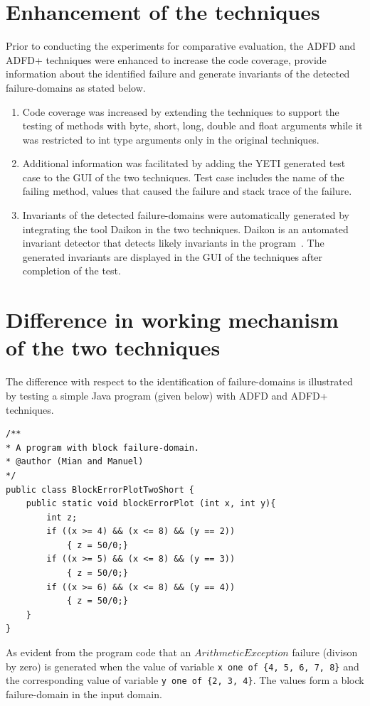 \section{Enhancement of the techniques}
Prior to conducting the experiments for comparative evaluation, the ADFD and ADFD+ techniques were enhanced to increase the code coverage, provide information about the identified failure and generate invariants of the detected failure-domains as stated below.
\begin{enumerate}

\item Code coverage was increased by extending the techniques to support the testing of methods with byte, short, long, double and float arguments while it was restricted to int type arguments only in the original techniques.

\item Additional information was facilitated by adding the YETI generated test case to the GUI of the two techniques. Test case includes the name of the failing method, values that caused the failure and stack trace of the failure.

\item Invariants of the detected failure-domains were automatically generated by integrating the tool Daikon in the two techniques. Daikon is an automated invariant detector that detects likely invariants in the program~\cite{ernst2007daikon}. The generated invariants are displayed in the GUI of the techniques after completion of the test. 

\end{enumerate}

\section{Difference in working mechanism of the two techniques}
The difference with respect to the identification of failure-domains is illustrated by testing a simple Java program (given below) with ADFD and ADFD+ techniques. 
\smallskip
\begin{lstlisting}
/** 
* A program with block failure-domain.
* @author (Mian and Manuel)
*/
public class BlockErrorPlotTwoShort {
	public static void blockErrorPlot (int x, int y){
		int z;
		if ((x >= 4) && (x <= 8) && (y == 2))
			{ z = 50/0;}
		if ((x >= 5) && (x <= 8) && (y == 3))
			{ z = 50/0;}
		if ((x >= 6) && (x <= 8) && (y == 4))
			{ z = 50/0;}
	}
}
\end{lstlisting}
\smallskip
As evident from the program code that an $ArithmeticException$ failure (divison by zero) is generated when the value of variable \verb+x one of {4, 5, 6, 7, 8}+ and the corresponding value of variable \verb+y one of {2, 3, 4}+. The values form a block failure-domain in the input domain. 

